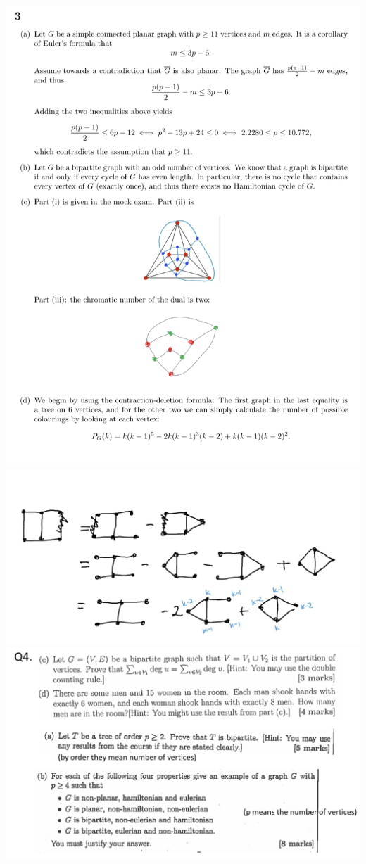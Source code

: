 \documentclass[10pt,landscape]{article}
\begin{document}
\begin{multicols}{2}
\includegraphics[width = 10.2 cm]{MockA3p1.png}
\includegraphics[width = 10 cm]{MockA3p2.png}
\includegraphics[width = 10 cm]{MockQ4.png}

\end{multicols}
\end{document}
